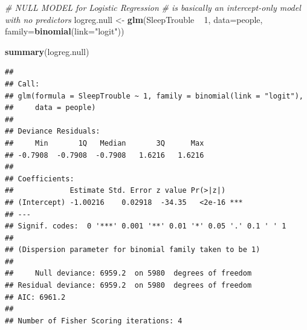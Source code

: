 \documentclass[]{article}
\newenvironment{Shaded}{\begin{snugshade}}{\end{snugshade}}
\newcommand{\KeywordTok}[1]{\textcolor[rgb]{0.13,0.29,0.53}{\textbf{{#1}}}}
\newcommand{\DataTypeTok}[1]{\textcolor[rgb]{0.13,0.29,0.53}{{#1}}}
\newcommand{\DecValTok}[1]{\textcolor[rgb]{0.00,0.00,0.81}{{#1}}}
\newcommand{\StringTok}[1]{\textcolor[rgb]{0.31,0.60,0.02}{{#1}}}
\newcommand{\CommentTok}[1]{\textcolor[rgb]{0.56,0.35,0.01}{\textit{{#1}}}}
\newcommand{\NormalTok}[1]{{#1}}
\begin{document}
\begin{Shaded}
\begin{Highlighting}[]
\CommentTok{# NULL MODEL for Logistic Regression }
\CommentTok{# is basically an intercept-only model with no predictors}
\NormalTok{logreg.null <-}\StringTok{ }\KeywordTok{glm}\NormalTok{(SleepTrouble ~}\StringTok{ }\DecValTok{1}\NormalTok{, }
                   \DataTypeTok{data=}\NormalTok{people, }
                   \DataTypeTok{family=}\KeywordTok{binomial}\NormalTok{(}\DataTypeTok{link=}\StringTok{"logit"}\NormalTok{))}

\KeywordTok{summary}\NormalTok{(logreg.null)}
\end{Highlighting}
\end{Shaded}

\begin{verbatim}
## 
## Call:
## glm(formula = SleepTrouble ~ 1, family = binomial(link = "logit"), 
##     data = people)
## 
## Deviance Residuals: 
##     Min       1Q   Median       3Q      Max  
## -0.7908  -0.7908  -0.7908   1.6216   1.6216  
## 
## Coefficients:
##             Estimate Std. Error z value Pr(>|z|)    
## (Intercept) -1.00216    0.02918  -34.35   <2e-16 ***
## ---
## Signif. codes:  0 '***' 0.001 '**' 0.01 '*' 0.05 '.' 0.1 ' ' 1
## 
## (Dispersion parameter for binomial family taken to be 1)
## 
##     Null deviance: 6959.2  on 5980  degrees of freedom
## Residual deviance: 6959.2  on 5980  degrees of freedom
## AIC: 6961.2
## 
## Number of Fisher Scoring iterations: 4
\end{verbatim}

\begin{Shaded}
\end{Shaded}
\end{document}
